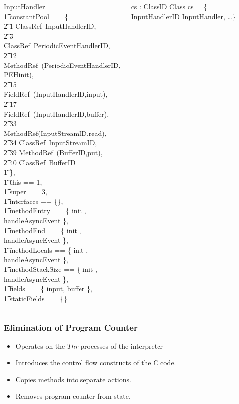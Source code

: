 \documentclass{beamer}
\begin{document}
\begin{frame}
\begin{columns}[T]
\begin{axdef}
    \where
      InputHandler = \lblot \\
      \t1 constantPool == \{ \\
      \t2 1 \mapsto ClassRef~InputHandlerID, \\
      \t2 3 \mapsto ClassRef~PeriodicEventHandlerID, \\
      \t2 12 \mapsto MethodRef~(PeriodicEventHandlerID, PEHinit), \\
      \t2 15 \mapsto FieldRef~(InputHandlerID,input), \\
      \t2 17 \mapsto FieldRef~(InputHandlerID,buffer), \\
      \t2 33 \mapsto MethodRef(InputStreamID,read), \\
      \t2 34 \mapsto ClassRef~InputStreamID, \\
      \t2 39 \mapsto MethodRef~(BufferID,put), \\
      \t2 40 \mapsto ClassRef~BufferID \\
      \t1 \}, \\
      \t1 this == 1, \\
      \t1 super == 3, \\
      \t1 interfaces == \{\}, \\
      \t1 methodEntry == \{ init , handleAsyncEvent  \}, \\
      \t1 methodEnd == \{ init , handleAsyncEvent  \}, \\
      \t1 methodLocals == \{ init , handleAsyncEvent  \}, \\
      \t1 methodStackSize == \{ init , handleAsyncEvent  \}, \\
      \t1 fields == \{ input, buffer \}, \\
      \t1 staticFields == \{\} \\
      \rblot
    \end{axdef}
    
    \begin{axdef}
      cs : ClassID \pfun Class
    \where
      cs = \{ InputHandlerID \mapsto InputHandler, \dots \}
    \end{axdef}
  \end{columns}
\end{frame}

\begin{frame}
  \frametitle{Elimination of Program Counter}
  \begin{itemize}
  \item Operates on the $Thr$ processes of the interpreter
  \item Introduces the control flow constructs of the C code.
  \item Copies methods into separate actions.
  \item Removes program counter from state.
  \end{itemize}
\end{frame}
\end{document}
